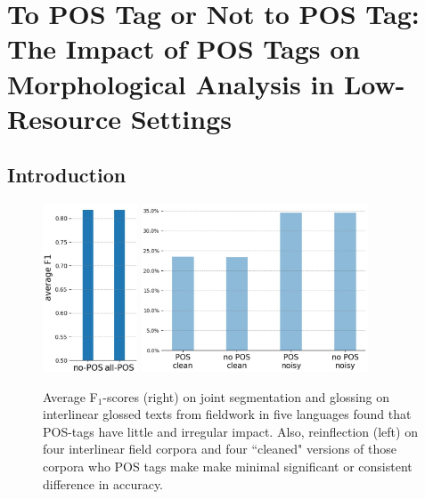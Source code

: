 \chapter{To POS Tag or Not to POS Tag: The Impact of POS Tags on Morphological Analysis in Low-Resource Settings}
  

\section{Introduction}
\label{sec:intro}


\begin{figure}[tb]
    \centering
    \includegraphics[height=5cm]{figs/POS-avgSegGlossCropped.jpg}
    \hspace{3cm}
    \includegraphics[height=5cm]{figs/POS-avgReinfl.jpg}
    \caption{Average  F$_1$-scores (right) on joint segmentation and glossing on interlinear glossed texts from fieldwork in five languages found that POS-tags have little and irregular impact. Also, reinflection (left) on four interlinear field corpora and four ``cleaned" versions of those corpora who POS tags make make minimal significant or consistent difference in accuracy.}
    \label{fig:avgseggls}
\end{figure}


